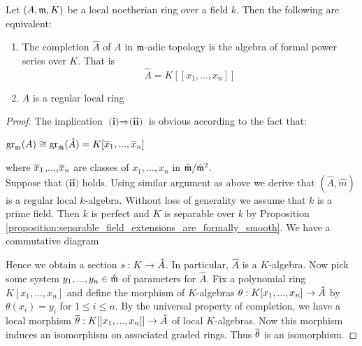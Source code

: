 \begin{theorem}\label{theorem:Cohens_structure_theorem}
Let $(A,\mathfrak{m},K)$ be a local noetherian ring over a field $k$. Then the following are equivalent:
\begin{enumerate}[label=\emph{\textbf{(\roman*)}}, leftmargin=3.0em]
\item The completion $\hat{A}$ of $A$ in $\mathfrak{m}$-adic topology is the algebra of formal power series over $K$. That is
$$\hat{A}=K[[x_1,...,x_n]]$$
\item $A$ is a regular local ring
\end{enumerate}
\end{theorem}
\begin{proof}
The implication $\textbf{(i)}\Rightarrow \textbf{(ii)}$ is obvious according to the fact that:
\begin{center}
$\mathrm{gr}_{\mathfrak{m}}(A)\cong \mathrm{gr}_{\hat{\mathfrak{m}}}(\hat{A})=K[\overline{x}_1,...,\overline{x}_n]$
\end{center}
where $\overline{x}_1$,...,$\overline{x}_n$ are classes of $x_1,...,x_n$ in $\hat{\mathfrak{m}}/\hat{\mathfrak{m}}^2$.\\
Suppose that $\textbf{(ii)}$ holds. Using similar argument as above we derive that $(\hat{A},\hat{m})$ is a regular local $k$-algebra. Without loss of generality we assume that $k$ is a prime field. Then $k$ is perfect and $K$ is separable over $k$ by Proposition \ref{proposition:separable_field_extensions_are_formally_smooth}. We have a commutative diagram
\begin{center}
\end{center}
Hence we obtain a section $s:K\rightarrow\hat{A}$. In particular, $\hat{A}$ is a $K$-algebra. Now pick some system $y_1,...,y_n\in \hat{\mathfrak{m}}$ of parameters for $\hat{A}$. Fix a polynomial ring $K[x_1,...,x_n]$ and define the morphism of $K$-algebras $\theta:K[x_1,...,x_n]\rightarrow \hat{A}$ by $\theta(x_i)=y_i$ for $1\leq i\leq n$. By the universal property of completion, we have a local morphism $\overline{\theta}:K[[x_1,...,x_n]]\rightarrow \hat{A}$ of local $K$-algebras. Now this morphism induces an isomorphism on associated graded rings. Thus $\overline{\theta}$ is an isomorphism.
\end{proof}

